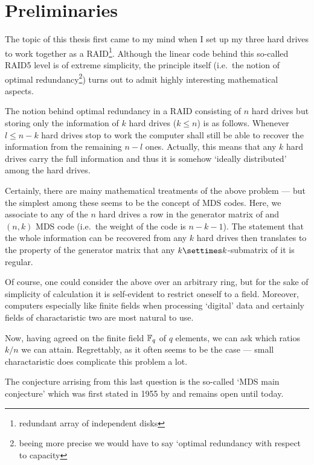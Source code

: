 \section*{Preliminaries}

The topic of this thesis first came to my mind when I set up my three hard drives to work together as a RAID\footnote{redundant array of independent disks}. Although the linear code behind this so-called RAID5 level is of extreme simplicity, the principle itself (i.e.~the notion of optimal redundancy\footnote{beeing more precise we would have to say `optimal redundancy with respect to capacity}) turns out to admit highly interesting mathematical aspects.

The notion behind optimal redundancy in a RAID consisting of $n$ hard drives but storing only the information of $k$ hard drives ($k\leq n$) is as follows. Whenever $l\leq n-k$ hard drives stop to work the computer shall still be able to recover the information from the remaining $n-l$ ones. Actually, this means that any $k$ hard drives carry the full information and thus it is somehow `ideally distributed' among the hard drives.

Certainly, there are mainy mathematical treatments of the above problem --- but the simplest among these seems to be the concept of MDS codes. Here, we associate to any of the $n$ hard drives a row in the generator matrix of and $(n,k)$ MDS code (i.e.~the  weight of the code is $n-k-1$). The statement that the whole information can be recovered from any $k$ hard drives then translates to the property of the generator matrix that any $k\settimes k$-submatrix of it is regular.

Of course, one could consider the above over an arbitrary ring, but for the sake of simplicity of calculation it is self-evident to restrict oneself to a field. Moreover, computers especially like finite fields when processing `digital' data and certainly fields of charactaristic two are most natural to use.

Now, having agreed on the finite field $\mathbb{F}_{q}$ of $q$ elements, we can ask which ratios $k/n$ we can attain. 
Regrettably, as it often seems to be the case --- small charactaristic does complicate this problem a lot.

The conjecture arrising from this last question is the so-called `MDS main conjecture' which was first stated in 1955 by  and remains open until today.

